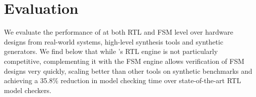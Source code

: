 \documentclass[acmsmall,screen,review]{acmart}
\begin{document}



\section{Evaluation}
\label{sec:eval}


We evaluate the performance of \toolname{} at both RTL and FSM level over hardware designs from real-world systems, high-level synthesis tools and synthetic generators.
We find below that while \toolname{}'s RTL engine is not particularly competitive, complementing it with the FSM engine allows verification of FSM designs very quickly, scaling better than other tools on synthetic benchmarks and achieving a 35.8\% reduction in model checking time over state-of-the-art RTL model checkers.
\end{document}
